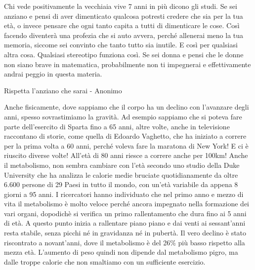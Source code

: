 \documentclass[12pt]{book} %
\begin{document}
\begin{mdframed}[linewidth=1pt]
\bigskip

Chi vede positivamente la vecchiaia vive 7 anni in più dicono gli studi. Se sei anziano e pensi di aver dimenticato
qualcosa potresti credere che sia per la tua età, o invece pensare che ogni tanto capita a tutti di dimenticare le
cose. Così facendo diventerà una profezia che si auto avvera, perché allenerai meno la tua memoria, siccome sei
convinto che tanto tutto sia inutile. E così per qualsiasi altra cosa. Qualsiasi stereotipo funziona così. Se sei donna
e pensi che le donne non siano brave in matematica, probabilmente non ti impegnerai e effettivamente andrai peggio in
questa materia.

Rispetta l'anziano che sarai - Anonimo


\bigskip

Anche fisicamente, dove sappiamo che il corpo ha un declino con l'avanzare degli anni, spesso
sovrastimiamo la gravità. Ad esempio sappiamo che si poteva fare parte dell'esercito di Sparta fino a 65
anni, altre volte, anche in televisione raccontano di
storie, come quella di \newline
Edoardo
Vaghetto, che ha iniziato a correre per la prima volta a 60 anni, perché voleva fare la maratona di New York! E ci è riuscito
diverse volte! All'età di 80 anni riesce a correre anche per 100km! Anche il metabolismo, non
sembra cambiare con l'età secondo uno studio della Duke
University che ha analizza le calorie medie bruciate
quotidianamente da oltre 6.600 persone di 29 Paesi in tutto il mondo, con un'età variabile da appena 8 giorni a 95
anni. I ricercatori hanno individuato che nel primo anno e mezzo di vita il metabolismo è molto veloce perché ancora
impegnato nella formazione dei vari organi, dopodichè si verifica un primo rallentamento che dura fino ai 5 anni di
età. A questo punto inizia a rallentare piano piano e dai venti ai sessant'anni resta stabile, senza picchi né in
gravidanza né in pubertà. Il vero declino è stato riscontrato a novant'anni, dove il metabolismo è del 26\% più basso
rispetto alla mezza età. L{}'aumento di peso quindi non dipende dal metabolismo pigro, ma dalle troppe calorie che non
smaltiamo con un sufficiente esercizio.
\end{mdframed}
\end{document}
